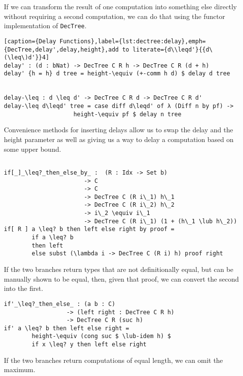 If we can transform the result of one computation into something else directly without requiring a second computation, we can do that using the functor implementation of \texttt{DecTree}.

\begin{lstlisting}[caption={Delay Functions},label={lst:dectree:delay},emph={DecTree,delay',delay,height},add to literate={d\\leqd'}{{d\(\leq\)d'}}4]
delay' : (d : bNat) -> DecTree C R h -> DecTree C R (d + h)
delay' {h = h} d tree = height-\equiv (+-comm h d) $ delay d tree


delay-\leq : d \leq d' -> DecTree C R d -> DecTree C R d'
delay-\leq d\leqd' tree = case diff d\leqd' of λ (Diff n by pf) ->
                    height-\equiv pf $ delay n tree
\end{lstlisting}

Convenience methods for inserting delays allow us to swap the delay and the height parameter as well as giving us a way to delay a computation based on some upper bound.

\begin{lstlisting}[caption={Alternatives to if-then-else},label={lst:dectree:ifthenelse-alt},emph={if,then,else,by,DecTree,\_then\_else\_by\_,\[\_\]\_}]

if[_]_\leq?_then_else_by_ :  (R : Idx -> Set b)
                       -> C
                       -> C
                       -> DecTree C (R i\_1) h\_1
                       -> DecTree C (R i\_2) h\_2
                       -> i\_2 \equiv i\_1
                       -> DecTree C (R i\_1) (1 + (h\_1 \lub h\_2))
if[ R ] a \leq? b then left else right by proof =
        if a \leq? b
        then left
        else subst (\lambda i -> DecTree C (R i) h) proof right
\end{lstlisting}

If the two branches return types that are not definitionally equal, but can be manually shown to be equal, then, given that proof, we can convert the second into the first.

\begin{lstlisting}[caption={Alternatives to if-then-else},label={lst:dectree:ifthenelse-alt:2},emph={if'\_,\_then\_else\_,if,then,else,DecTree}]
if'_\leq?_then_else_ : (a b : C)
                  -> (left right : DecTree C R h)
                  -> DecTree C R (suc h)
if' a \leq? b then left else right =
        height-\equiv (cong suc $ \lub-idem h) $
        if x \leq? y then left else right
\end{lstlisting}

If the two branches return computations of equal length, we can omit the maximum.
